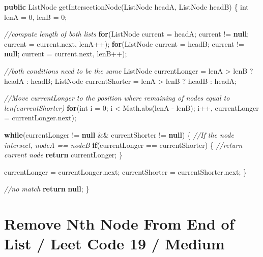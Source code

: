 \documentclass[]{book}
\newenvironment{Shaded}{\begin{snugshade}}{\end{snugshade}}
\newcommand{\BuiltInTok}[1]{#1}
\newcommand{\CommentTok}[1]{\textcolor[rgb]{0.56,0.35,0.01}{\textit{#1}}}
\newcommand{\DataTypeTok}[1]{\textcolor[rgb]{0.13,0.29,0.53}{#1}}
\newcommand{\DecValTok}[1]{\textcolor[rgb]{0.00,0.00,0.81}{#1}}
\newcommand{\FunctionTok}[1]{\textcolor[rgb]{0.00,0.00,0.00}{#1}}
\newcommand{\KeywordTok}[1]{\textcolor[rgb]{0.13,0.29,0.53}{\textbf{#1}}}
\newcommand{\NormalTok}[1]{#1}
\begin{document}
\begin{Shaded}
\begin{Highlighting}[]
\KeywordTok{public}\NormalTok{ ListNode }\FunctionTok{getIntersectionNode}\NormalTok{(ListNode headA, ListNode headB) \{}
    \DataTypeTok{int}\NormalTok{ lenA = }\DecValTok{0}\NormalTok{, lenB = }\DecValTok{0}\NormalTok{;}

    \CommentTok{//compute length of both lists}
    \KeywordTok{for}\NormalTok{(ListNode current = headA; current != }\KeywordTok{null}\NormalTok{; current = current.}\FunctionTok{next}\NormalTok{, lenA++);}
    \KeywordTok{for}\NormalTok{(ListNode current = headB; current != }\KeywordTok{null}\NormalTok{; current = current.}\FunctionTok{next}\NormalTok{, lenB++);}

    \CommentTok{//both conditions need to be the same}
\NormalTok{    ListNode currentLonger = lenA > lenB ? headA : headB;}
\NormalTok{    ListNode currentShorter = lenA > lenB ? headB : headA;}

    \CommentTok{//Move currentLonger to the position where remaining of nodes equal to len(currentShorter)}
    \KeywordTok{for}\NormalTok{(}\DataTypeTok{int}\NormalTok{ i = }\DecValTok{0}\NormalTok{; i < }\BuiltInTok{Math}\NormalTok{.}\FunctionTok{abs}\NormalTok{(lenA - lenB); i++, currentLonger = currentLonger.}\FunctionTok{next}\NormalTok{);}

    \KeywordTok{while}\NormalTok{(currentLonger != }\KeywordTok{null}\NormalTok{ && currentShorter != }\KeywordTok{null}\NormalTok{) \{}
        \CommentTok{//If the node intersect, nodeA == nodeB}
        \KeywordTok{if}\NormalTok{(currentLonger == currentShorter) \{}
            \CommentTok{//return current node}
            \KeywordTok{return}\NormalTok{ currentLonger;}
\NormalTok{        \}}

\NormalTok{        currentLonger = currentLonger.}\FunctionTok{next}\NormalTok{;}
\NormalTok{        currentShorter = currentShorter.}\FunctionTok{next}\NormalTok{;}
\NormalTok{    \}}

    \CommentTok{//no match}
    \KeywordTok{return} \KeywordTok{null}\NormalTok{;}
\NormalTok{\}}
\end{Highlighting}
\end{Shaded}

\hypertarget{remove-nth-node-from-end-of-list-leet-code-19-medium}{%
\section{Remove Nth Node From End of List / Leet Code 19 / Medium}\label{remove-nth-node-from-end-of-list-leet-code-19-medium}}
\end{document}
